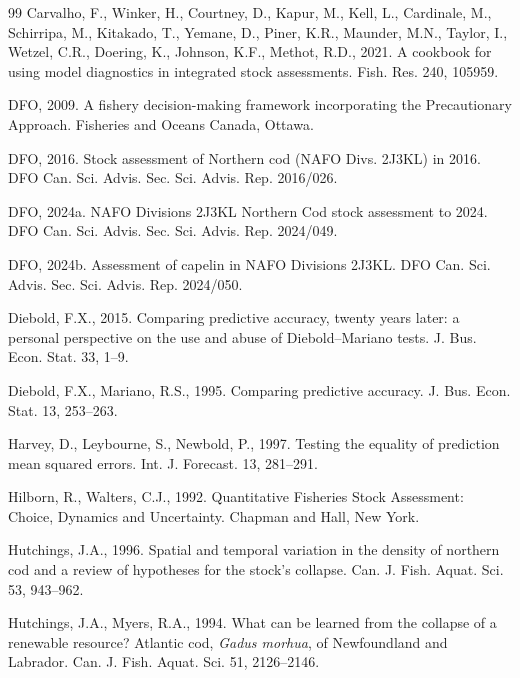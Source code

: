 \begin{thebibliography}{99}
Carvalho, F., Winker, H., Courtney, D., Kapur, M., Kell, L., Cardinale, M., Schirripa, M., Kitakado, T., Yemane, D., Piner, K.R., Maunder, M.N., Taylor, I., Wetzel, C.R., Doering, K., Johnson, K.F., Methot, R.D., 2021. A cookbook for using model diagnostics in integrated stock assessments. Fish. Res. 240, 105959.

DFO, 2009. A fishery decision-making framework incorporating the Precautionary Approach. Fisheries and Oceans Canada, Ottawa.

DFO, 2016. Stock assessment of Northern cod (NAFO Divs. 2J3KL) in 2016. DFO Can. Sci. Advis. Sec. Sci. Advis. Rep. 2016/026.

DFO, 2024a. NAFO Divisions 2J3KL Northern Cod stock assessment to 2024. DFO Can. Sci. Advis. Sec. Sci. Advis. Rep. 2024/049.

DFO, 2024b. Assessment of capelin in NAFO Divisions 2J3KL. DFO Can. Sci. Advis. Sec. Sci. Advis. Rep. 2024/050.

Diebold, F.X., 2015. Comparing predictive accuracy, twenty years later: a personal perspective on the use and abuse of Diebold--Mariano tests. J. Bus. Econ. Stat. 33, 1--9.

Diebold, F.X., Mariano, R.S., 1995. Comparing predictive accuracy. J. Bus. Econ. Stat. 13, 253--263.

Harvey, D., Leybourne, S., Newbold, P., 1997. Testing the equality of prediction mean squared errors. Int. J. Forecast. 13, 281--291.

Hilborn, R., Walters, C.J., 1992. Quantitative Fisheries Stock Assessment: Choice, Dynamics and Uncertainty. Chapman and Hall, New York.

Hutchings, J.A., 1996. Spatial and temporal variation in the density of northern cod and a review of hypotheses for the stock's collapse. Can. J. Fish. Aquat. Sci. 53, 943--962.

Hutchings, J.A., Myers, R.A., 1994. What can be learned from the collapse of a renewable resource? Atlantic cod, \emph{Gadus morhua}, of Newfoundland and Labrador. Can. J. Fish. Aquat. Sci. 51, 2126--2146.


\end{thebibliography}
